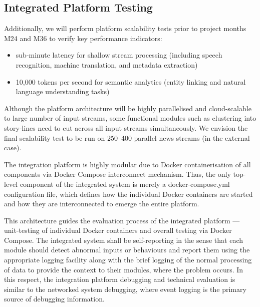 \subsection{Integrated Platform Testing}\label{sec:IP}

Additionally, we will perform \SUMMA platform scalability tests prior to project months M24 and M36 to verify key performance indicators:
\begin{itemize}
\item sub-minute latency for shallow stream processing (including speech recognition, machine translation, and metadata extraction)
\item 10,000 tokens per second for semantic analytics (entity linking and natural language understanding tasks)
\end{itemize}

Although the platform architecture will be highly parallelised and cloud-scalable to large number of input streams, some functional modules such as clustering into story-lines need to cut across all input streams simultaneously. We envision the final scalability test to be run on 250–400 parallel news streams (in the external  case).

The integration platform is highly modular due to Docker containerisation of all components via Docker Compose interconnect mechanism. Thus, the only top-level component of the integrated system is merely a docker-compose.yml configuration file, which defines how the individual Docker containers are started and how they are interconnected to emerge the entire \SUMMA platform.

This architecture guides the evaluation process of the integrated platform --- unit-testing of individual Docker containers and overall testing via Docker Compose. The integrated system shall be self-reporting in the sense that each module should detect abnormal inputs or behaviours and report them using the appropriate logging facility along with the brief logging of the normal processing of data to provide the context to their modules, where the problem occurs. In this respect, the \SUMMA integration platform debugging and technical evaluation is similar to the networked system debugging, where event logging is the primary source of debugging information.

